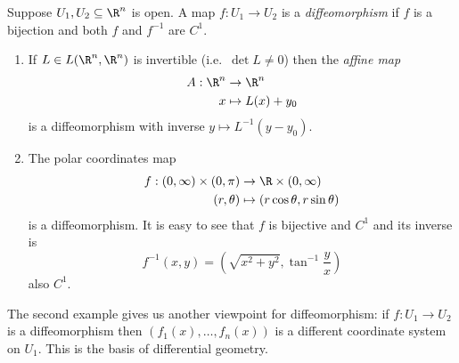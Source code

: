 \documentclass[a4paper]{article}
\theoremstyle{definition}
\begin{document}
\begin{definition}[Diffeomorphism]
  Suppose \(U_1, U_2 \subseteq \R^n\) is open. A map \(f: U_1 \to U_2\) is a \emph{diffeomorphism} if \(f\) is a bijection and both \(f\) and \(f^{-1}\) are \(C^1\).
\end{definition}

\begin{eg}\leavevmode
  \begin{enumerate}
  \item If \(L \in L(\R^n, \R^n)\) is invertible (i.e.\ \(\det L \neq 0\)) then the \emph{affine map}
    \begin{align*}
      A: \R^n &\to \R^n \\
      x &\mapsto L(x) + y_0
    \end{align*}
    is a diffeomorphism with inverse \(y \mapsto L^{-1}(y - y_0)\).
  \item The polar coordinates map
    \begin{align*}
      f: (0, \infty) \times (0, \pi) &\to \R \times (0, \infty) \\
      (r, \theta) &\mapsto (r \cos \theta, r \sin \theta)
    \end{align*}
    is a diffeomorphism. It is easy to see that \(f\) is bijective and \(C^1\) and its inverse is
    \[
      f^{-1}(x, y) = \left( \sqrt{x^2 + y^2}, \tan^{-1} \frac{y}{x} \right)
    \]
    also \(C^1\).
  \end{enumerate}
\end{eg}

The second example gives us another viewpoint for diffeomorphism: if \(f: U_1 \to U_2\) is a diffeomorphism then \((f_1(x), \dots, f_n(x))\) is a different coordinate system on \(U_1\). This is the basis of differential geometry.
\end{document}

